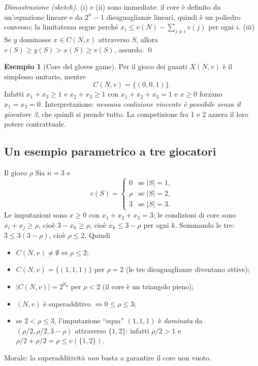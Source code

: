 \documentclass[12pt,a4paper,twoside]{book}
\theoremstyle{plain}
\theoremstyle{definition}
\newtheorem{example}[theorem]{Esempio}
\begin{document}
\textit{Dimostrazione (sketch).} (i) e (ii) sono immediate: il core è definito da
un'equazione lineare e da $2^n-1$ disuguaglianze lineari, quindi è un poliedro
convesso; la limitatezza segue perché $x_i\le v(N)-\sum_{j\ne i}v(j)$ per ogni
$i$. (iii) Se $y$ dominasse $x\in C(N,v)$ attraverso $S$, allora
$v(S)\ge y(S)>x(S)\ge v(S)$, assurdo. \qed

\begin{example}[Core del gloves game]
Per il gioco dei guanti $X(N,v)$ è il simplesso unitario, mentre
\[
  C(N,v)=\{(0,0,1)\}.
\]
Infatti $x_1+x_3\ge 1$ e $x_2+x_3\ge 1$ con $x_1+x_2+x_3=1$ e $x\ge 0$ forzano
$x_1=x_2=0$. Interpretazione: \emph{nessuna coalizione vincente è possibile senza
il giocatore 3}, che quindi si prende tutto. La competizione fra 1 e 2 azzera il
loro potere contrattuale.
\end{example}

\subsection{Un esempio parametrico a tre giocatori}

\begin{exbox}{Il gioco $\rho$}
Sia $n=3$ e
\[
  v(S)=\begin{cases}
   0 & \text{se } |S|=1,\\
   \rho & \text{se } |S|=2,\\
   3 & \text{se } |S|=3.
  \end{cases}
\]
Le imputazioni sono $x\ge 0$ con $x_1+x_2+x_3=3$; le condizioni di core sono
$x_i+x_j\ge\rho$, cioè $3-x_k\ge\rho$, cioè $x_k\le 3-\rho$ per ogni $k$.
Sommando le tre: $3\le 3(3-\rho)$, cioè $\rho\le 2$. Quindi
\begin{itemize}
  \item $C(N,v)\ne\emptyset \iff \rho\le 2$;
  \item $C(N,v)=\{(1,1,1)\}$ per $\rho=2$ (le tre disuguaglianze diventano attive);
  \item $|C(N,v)|=2^{\aleph_0}$ per $\rho<2$ (il core è un triangolo pieno);
  \item $(N,v)$ è superadditivo $\iff 0\le\rho\le 3$;
  \item se $2<\rho\le 3$, l'imputazione ``equa'' $(1,1,1)$ è \emph{dominata} da
        $(\rho/2,\rho/2,3-\rho)$ attraverso $\{1,2\}$: infatti $\rho/2>1$ e
        $\rho/2+\rho/2=\rho\le v(\{1,2\})$.
\end{itemize}
Morale: la superadditività \emph{non} basta a garantire il core non vuoto.
\end{exbox}
\end{document}
